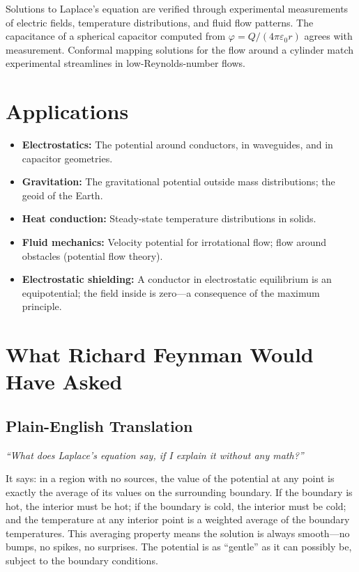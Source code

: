 Solutions to Laplace's equation are verified through experimental measurements of electric fields, temperature distributions, and fluid flow patterns. The capacitance of a spherical capacitor computed from $\varphi = Q/(4\pi\varepsilon_{0}r)$ agrees with measurement. Conformal mapping solutions for the flow around a cylinder match experimental streamlines in low-Reynolds-number flows.
\section*{Applications}

\begin{itemize}
  \item \textbf{Electrostatics:} The potential around conductors, in waveguides, and in capacitor geometries.
  \item \textbf{Gravitation:} The gravitational potential outside mass distributions; the geoid of the Earth.
  \item \textbf{Heat conduction:} Steady-state temperature distributions in solids.
  \item \textbf{Fluid mechanics:} Velocity potential for irrotational flow; flow around obstacles (potential flow theory).
  \item \textbf{Electrostatic shielding:} A conductor in electrostatic equilibrium is an equipotential; the field inside is zero---a consequence of the maximum principle.
\end{itemize}
\section*{What Richard Feynman Would Have Asked}

\subsection*{Plain-English Translation}
\textit{``What does Laplace's equation say, if I explain it without any math?''}

It says: in a region with no sources, the value of the potential at any point is exactly the average of its values on the surrounding boundary. If the boundary is hot, the interior must be hot; if the boundary is cold, the interior must be cold; and the temperature at any interior point is a weighted average of the boundary temperatures. This averaging property means the solution is always smooth---no bumps, no spikes, no surprises. The potential is as ``gentle'' as it can possibly be, subject to the boundary conditions.

